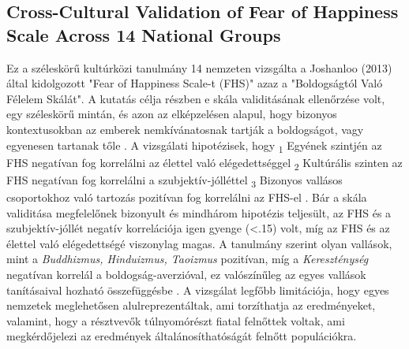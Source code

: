 \subsection{Cross-Cultural Validation of
	Fear of Happiness Scale Across 14 National Groups \cite{joshanloo_lepshokova_panyusheva_natalia_poon_yeung_sundaram_achoui_asano_igarashi}}
Ez a széleskörű kultúrközi tanulmány 14 nemzeten vizsgálta a Joshanloo (2013) által kidolgozott "Fear of Happiness Scale-t (FHS)" azaz a "Boldogságtól Való Félelem Skálát". A kutatás célja részben e skála validitásának ellenőrzése volt, egy széleskörű mintán, és azon az elképzelésen alapul, hogy bizonyos kontextusokban az emberek nemkívánatosnak tartják a boldogságot, vagy egyenesen tartanak tőle \cite{joshanloo_lepshokova_panyusheva_natalia_poon_yeung_sundaram_achoui_asano_igarashi}. A vizsgálati hipotézisek, hogy \textsubscript{1} Egyének szintjén az FHS negatívan fog korrelálni az élettel való elégedettséggel \textsubscript{2} Kultúrális szinten az FHS negatívan fog korrelálni a szubjektív-jólléttel \textsubscript{3} Bizonyos vallásos csoportokhoz való tartozás pozitívan fog korrelálni az FHS-el \cite{joshanloo_lepshokova_panyusheva_natalia_poon_yeung_sundaram_achoui_asano_igarashi}. Bár a skála validitása megfelelőnek bizonyult és mindhárom hipotézis teljesült, az FHS és a szubjektív-jóllét negatív korrelációja igen gyenge (\textless.15) volt, míg az FHS és az élettel való elégedettségé viszonylag magas. A tanulmány szerint olyan vallások, mint a \textit{Buddhizmus, Hinduizmus, Taoizmus} pozitívan, míg a \textit{Kereszténység} negatívan korrelál a boldogság-averzióval, ez valószínűleg az egyes vallások tanításaival hozható összefüggésbe \cite{joshanloo_lepshokova_panyusheva_natalia_poon_yeung_sundaram_achoui_asano_igarashi}. A vizsgálat legfőbb limitációja, hogy egyes nemzetek meglehetősen alulreprezentáltak, ami torzíthatja az eredményeket, valamint, hogy a résztvevők túlnyomórészt fiatal felnőttek voltak, ami megkérdőjelezi az eredmények általánosíthatóságát felnőtt populációkra.

